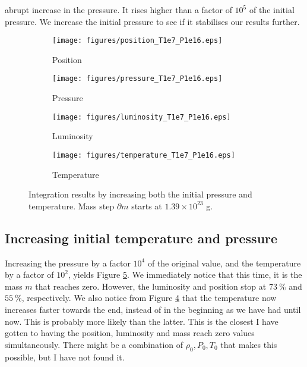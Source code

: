 \documentclass[a4paper, 11pt, english]{article}
\newcommand{\refig}[1]{\textcolor{blue}{\ref{fig:#1}}} %
\begin{document}
abrupt increase in the pressure. It rises higher than a factor of $10^5$ of the initial
pressure. We increase the initial pressure to see if it stabilises our results further.
%
\begin{figure}[htpb]
	\begin{subfigure}{0.49\textwidth}
		\texttt{[image: figures/position\_T1e7\_P1e16.eps]}
		\caption{Position}
		\label{fig:position_T1e7_P1e16}
	\end{subfigure}\hfill
	\begin{subfigure}{0.49\textwidth}
		\texttt{[image: figures/pressure\_T1e7\_P1e16.eps]}
		\caption{Pressure}
		\label{fig:pressure_T1e7_P1e16}
	\end{subfigure}\hfill
	\vspace{0.35cm}
	\begin{subfigure}{0.49\textwidth}
		\texttt{[image: figures/luminosity\_T1e7\_P1e16.eps]}
		\caption{Luminosity}
		\label{fig:luminosity_T1e7_P1e16}
	\end{subfigure}\hfill
	\begin{subfigure}{0.49\textwidth}
		\texttt{[image: figures/temperature\_T1e7\_P1e16.eps]}
		\caption{Temperature}
		\label{fig:temperature_T1e7_P1e16}
	\end{subfigure}
	\vspace{0.2cm}
	\caption{Integration results by increasing both the initial pressure and temperature.
		Mass step $\partial m$ starts at $1.39 \times 10^{23}$ g.}
	\label{fig:T1e7_P1e16}
\end{figure}

\subsection{Increasing initial temperature and pressure}
Increasing the pressure by a factor $10^4$ of the original value, and the temperature by a
factor of $10^2$, yields Figure \refig{T1e7_P1e16}. We immediately notice that this time,
it is the mass $m$ that reaches zero. However, the luminosity and position stop at
$73 \ \%$ and $55 \ \%$, respectively. We also notice from Figure
\refig{temperature_T1e7_P1e16} that the temperature now increases faster towards the end,
instead of in the beginning as we have had until now. This is probably more likely than
the latter. This is the closest I have gotten to having the position, luminosity and mass
reach zero values simultaneously. There might be a combination of $\rho_0, P_0, T_0$ that
makes this possible, but I have not found it.
\end{document}
